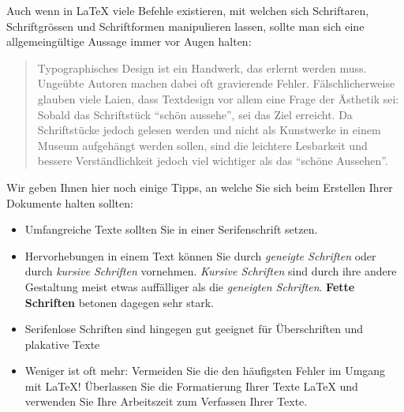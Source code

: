 \documentclass[11pt, a4paper,draft]{article}
\newcommand{\ltx}{\LaTeX}
\begin{document}
Auch wenn in \ltx{} viele Befehle existieren, mit welchen sich Schriftaren, Schriftgrössen und Schriftformen manipulieren lassen, sollte man sich eine allgemeingültige Aussage immer vor Augen halten:
\begin{quote}
Typographisches Design ist ein Handwerk, das erlernt werden muss. Ungeübte Autoren machen dabei oft gravierende Fehler. Fälschlicherweise glauben viele Laien, dass Textdesign vor allem eine Frage der Ästhetik sei: Sobald das Schriftstück "`schön aussehe"', sei das Ziel erreicht. Da Schriftstücke jedoch gelesen werden und nicht als Kunstwerke in einem Museum aufgehängt werden sollen, sind die leichtere Lesbarkeit und bessere Verständlichkeit jedoch viel wichtiger als das "`schöne Aussehen"'.
\end{quote}

\noindent Wir geben Ihnen hier noch einige Tipps, an welche Sie sich beim Erstellen Ihrer Dokumente halten sollten:
\begin{itemize}
\item[\ding{43}] Umfangreiche Texte sollten Sie in einer Serifenschrift setzen.
\item[\ding{43}] Hervorhebungen in einem Text können Sie durch \textsl{geneigte Schriften} oder durch \textit{kursive Schriften} vornehmen. \textit{Kursive Schriften} sind durch ihre andere Gestaltung meist etwas auffälliger als die \textsl{geneigten Schriften}. \textbf{Fette Schriften} betonen dagegen sehr stark.
\item[\ding{43}]  \textsf{Serifenlose Schriften sind hingegen gut geeignet für Überschriften und plakative Texte}
\item[\ding{43}] Weniger ist oft mehr: Vermeiden Sie die den häufigsten Fehler im Umgang mit \ltx! Überlassen Sie die Formatierung Ihrer Texte \ltx{} und verwenden Sie Ihre Arbeitszeit zum Verfassen Ihrer Texte.
\end{itemize}
\end{document}
